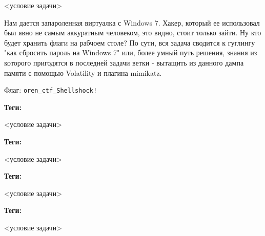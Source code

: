 \documentclass[idxtotoc,hyperref,openany,oneside]{files/forensics} %
\begin{document}
\begin{tcolorbox}
<условие задачи>
\end{tcolorbox}

Нам дается запароленная виртуалка с Windows 7. Хакер, который ее использовал был явно не самым аккуратным человеком, это видно, стоит только зайти. Ну кто будет хранить флаги на рабчоем столе? По сути, вся задача сводится к гуглингу "как сбросить пароль на Windows 7" или, более умный путь решения, знания из которого пригодятся в последней задачи ветки - вытащить из данного дампа памяти с помощью Volatility и плагина mimikatz.

Флаг: \verb|oren_ctf_Shellshock!|




\textbf{Теги:} \vspace{\baselineskip}

\begin{tcolorbox}
<условие задачи>
\end{tcolorbox}



\textbf{Теги:} \vspace{\baselineskip}

\begin{tcolorbox}
<условие задачи>
\end{tcolorbox}




\textbf{Теги:} \vspace{\baselineskip}

\begin{tcolorbox}
<условие задачи>
\end{tcolorbox}




\textbf{Теги:} \vspace{\baselineskip}

\begin{tcolorbox}
<условие задачи>
\end{tcolorbox}

\end{document}
